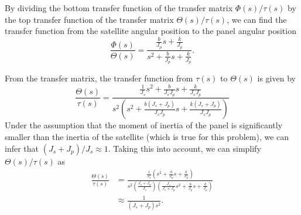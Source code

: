 %

By dividing the bottom transfer function of the transfer matrix $\Phi(s)/\tau(s)$ by the top transfer function of the transfer matrix $\Theta(s)/\tau(s)$, we can find the transfer function from the satellite angular position to the panel angular position
\begin{equation}
	\frac{\Phi(s)}{\Theta(s)} = \frac{\frac{b}{J_p}s+\frac{k}{J_p}}{s^2+\frac{b}{J_p}s+\frac{k}{J_p}}.
\label{eq:soln_c6_4}
\end{equation}

From the transfer matrix, the transfer function from $\tau(s)$ to $\Theta(s)$ is given by
\begin{equation}
	\frac{\Theta(s)}{\tau(s)} = \frac{\frac{1}{J_s}s^2+\frac{b}{J_sJ_p}s+\frac{k}{J_sJ_p}}{s^2\left( s^2+\frac{b(J_s+J_p)}{J_sJ_p}s+\frac{k(J_s+J_p)}{J_sJ_p} \right)}
\end{equation}
Under the assumption that the moment of inertia of the panel is significantly smaller than the inertia of the satellite (which is true for this problem), we can infer that $(J_s+J_p)/J_s \approx 1$. Taking this into account, we can simplify $\Theta(s)/\tau(s)$ as
\begin{align*}
	\frac{\Theta(s)}{\tau(s)} &= \frac{\frac{1}{J_s}\left(s^2+\frac{b}{J_p}s+\frac{k}{J_p}\right)}{s^2 \left( \frac{J_s+J_p}{J_s} \right)\left( \frac{J_s}{J_s+J_p} s^2+\frac{b}{J_p}s+\frac{k}{J_p} \right)} \\
							  &\approx \frac{1}{(J_s+J_p)s^2} .
\end{align*}


